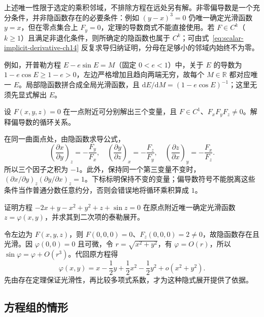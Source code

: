 上述唯一性限于选定的乘积邻域，不排除方程在远处另有解。非零偏导数是一个充分条件，并非隐函数存在的必要条件：例如 $(y-x)^3=0$ 仍唯一确定光滑函数 $y=x$，但在零点集合上 $F_y=0$，定理的导数商式不能直接使用。若 $F\in C^k$（$k\geq1$）且满足非退化条件，则所确定的隐函数也属于 $C^k$；可由式~\eqref{eq:scalar-implicit-derivative-ch14} 反复求导归纳证明，分母在足够小的邻域内始终不为零。

例如，开普勒方程 $E-e\sin E=M$（固定 $0<e<1$）中，关于 $E$ 的导数为 $1-e\cos E\geq1-e>0$，左边严格增加且趋向两端无穷，故每个 $M\in\mathbb R$ 都对应唯一 $E$。局部隐函数拼合成全局光滑函数，且 $\mathrm dE/\mathrm dM=(1-e\cos E)^{-1}$；这里无须先显式解出 $E$。

\begin{example}
\label{ex:cyclic-partial-derivative-ch14}
设 $F(x,y,z)=0$ 在一点附近可分别解出三个变量，且 $F\in C^1$、$F_xF_yF_z\ne0$。解释偏导数的循环关系。
\end{example}
\begin{solve}
在同一曲面点处，由隐函数求导公式，
\[
    \left(\frac{\partial x}{\partial y}\right)_z=-\frac{F_y}{F_x},\quad
    \left(\frac{\partial y}{\partial z}\right)_x=-\frac{F_z}{F_y},\quad
    \left(\frac{\partial z}{\partial x}\right)_y=-\frac{F_x}{F_z}.
\]
所以三个因子之积为 $-1$。此外，保持同一个第三变量不变时，$\left(\partial x/\partial y\right)_z\left(\partial y/\partial x\right)_z=1$。下标标明保持不变的变量；偏导数符号不能脱离这些条件当作普通分数任意约分，否则会错误地将循环乘积算成 $1$。
\end{solve}

\begin{example}
\label{ex:implicit-taylor-expansion-ch14}
证明方程 $-2x+y-x^2+y^2+z+\sin z=0$ 在原点附近唯一确定光滑函数 $z=\varphi(x,y)$，并求其到二次项的泰勒展开。
\end{example}
\begin{solve}
令左边为 $F(x,y,z)$，则 $F(0,0,0)=0$、$F_z(0,0,0)=2\ne0$，故隐函数存在且光滑。因 $\varphi(0,0)=0$ 且可微，令 $r=\sqrt{x^2+y^2}$，有 $\varphi=O(r)$，所以 $\sin\varphi=\varphi+O(r^3)$。代回原方程得
\[
    \varphi(x,y)=x-\frac12y+\frac12x^2-\frac12y^2+o(x^2+y^2).
\]
先由存在定理保证光滑性，再比较多项式系数，才为这种隐式展开提供了依据。
\end{solve}

\subsection{方程组的情形}
\label{subsec:implicit-functions-for-equation-systems}

